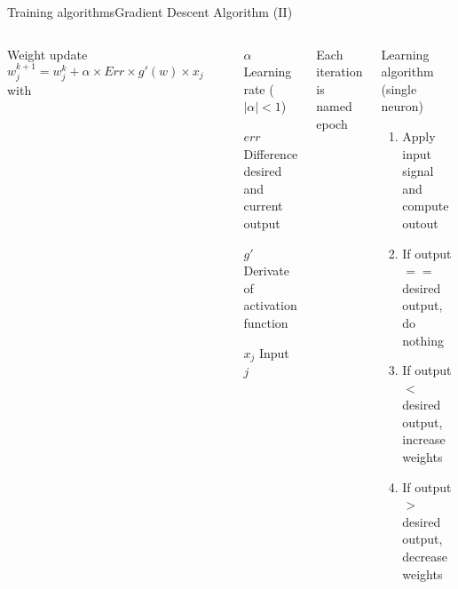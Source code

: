 \documentclass[10pt,compress]{beamer} %
\begin{document}
\begin{frame}{Training algorithms}{Gradient Descent Algorithm (II)}
	\small{
	\begin{columns}
		Weight update
		\begin{equation*}
		w_{j}^{k+1} = w_{j}^k + \alpha \times Err \times g'(w) \times x_j
		\end{equation*}
		with
		\begin{flushleft}
		\begin{itemize}
		\item[$\alpha$] Learning rate ($|\alpha|<1$)
		\item[$err$] Difference desired and current output
		\item[$g'$] Derivate of activation function
		\item[$x_j$] Input $j$
		\end{itemize}
		\end{flushleft}
		Each iteration is named \alert{epoch}
		\begin{block}{Learning algorithm (single neuron)}
		\begin{enumerate}
		\item Apply input signal and compute outout
		\item If output $==$ desired output, do nothing
		\item If output $<$ desired output, increase weights
		\item If output $>$ desired output, decrease weights
		\end{enumerate}
		\end{block}
	\end{columns}
	}
\end{frame}
\end{document}
